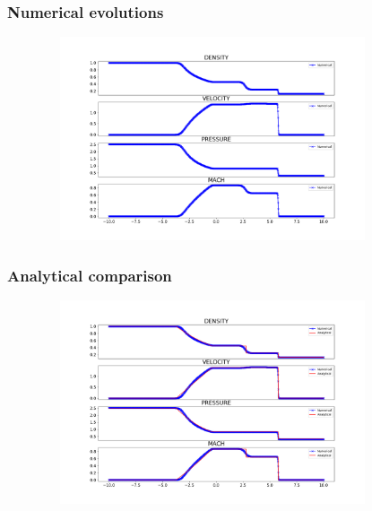 \documentclass{beamer}
\begin{document}
    \begin{frame}
        \frametitle{Numerical evolutions}
            \begin{figure}
                \includegraphics[height = 60mm,width = 100mm]{shock3.png}             
            \end{figure}        
    \end{frame}


    \begin{frame}
        \frametitle{Analytical comparison}
            \begin{figure}
                \includegraphics[height = 60mm,width = 100mm]{ana_num.png}             
            \end{figure}            
    \end{frame}
\end{document}
